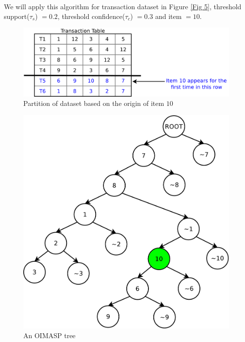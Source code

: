 \documentclass[5p, twocolumn]{elsarticle}
\begin{document}
We will apply this algorithm for transaction dataset in Figure \ref{Fig 5}, threshold support($ \tau _{s} $) $ = 0.2 $, threshold confidence($ \tau _{c} $) $ = 0.3 $ and item $ = 10 $.

\begin{figure}
\begin{center}
\includegraphics[scale=0.35]{pdf/partition}
\end{center}
\caption{Partition of dataset based on the origin of item $ 10 $}
\label{Fig 8}
\end{figure}

\begin{figure}
\begin{center}
\includegraphics[scale=0.25]{pdf/moimasp}
\end{center}
\caption{An OIMASP tree}
\label{Fig 9}
\end{figure}
\end{document}
